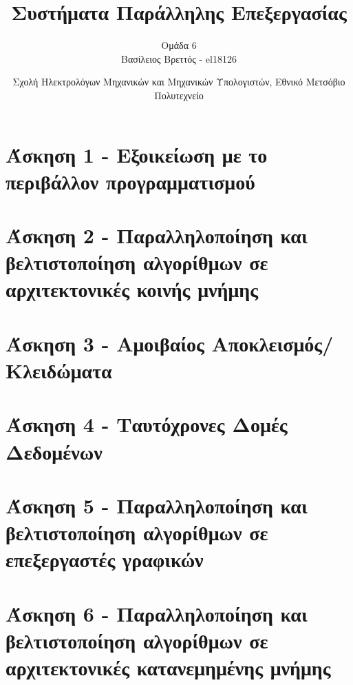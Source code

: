\documentclass[letterpaper,12pt]{article}
\begin{document}
\title{Συστήματα Παράλληλης Επεξεργασίας}
\author{Ομάδα 6 \\
Βασίλειος Βρεττός - el18126}
\date{Σχολή Ηλεκτρολόγων Μηχανικών και Μηχανικών Υπολογιστών, Εθνικό Μετσόβιο Πολυτεχνείο}
\maketitle

\section{Άσκηση 1 - Εξοικείωση με το περιβάλλον προγραμματισμού}


\section{Άσκηση 2 - Παραλληλοποίηση και βελτιστοποίηση αλγορίθμων σε αρχιτεκτονικές κοινής μνήμης}


\section{Άσκηση 3 - Αμοιβαίος Αποκλεισμός/Κλειδώματα}


\section{Άσκηση 4 - Ταυτόχρονες Δομές Δεδομένων}


\section{Άσκηση 5 - Παραλληλοποίηση και βελτιστοποίηση αλγορίθμων σε επεξεργαστές γραφικών}


\section{Άσκηση 6 - Παραλληλοποίηση και βελτιστοποίηση αλγορίθμων σε αρχιτεκτονικές κατανεμημένης μνήμης}

\end{document}

